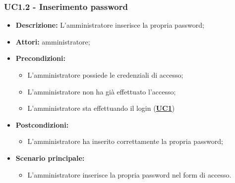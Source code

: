 \documentclass[5pt]{article}
\begin{document}
\subsubsection{UC1.2 - Inserimento password}
\label{sec:UC1.2}
\begin{itemize}
	\item \textbf{Descrizione:} L’amministratore inserisce la propria password;
	\item \textbf{Attori:} amministratore;
	\item \textbf{Precondizioni:} 
	\begin{itemize}
		\item L’amministratore possiede le credenziali di accesso;
		\item L’amministratore non ha già effettuato l’accesso;
		\item L’amministratore sta effettuando il login (\hyperref[sec:UC1]{\textbf{UC1}})
	\end{itemize}
	\item \textbf{Postcondizioni:} 
	\begin{itemize}
		\item L’amministratore ha inserito correttamente la propria password;
	\end{itemize}
	\item \textbf{Scenario principale:} 
	\begin{itemize}
		\item L’amministratore inserisce la propria password nel form di accesso.
	\end{itemize}
\end{itemize}
\end{document}
